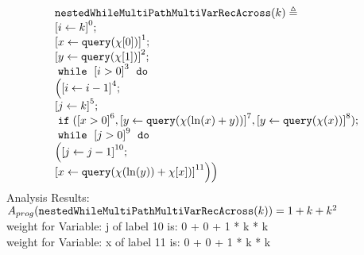                             \begin{example}
                                \[
                                \begin{array}{l}
                                \kw{nestedWhileMultiPathMultiVarRecAcross}(k) \triangleq \\
                                    \clabel{\assign{i}{k} }^{0} ; \\
                                    \clabel{ \assign{x}{\query(\chi[0])}}^{1} ; \\
                                    \clabel{ \assign{y}{\query(\chi[1])}}^{2} ; \\
                                        \ewhile ~ \clabel{i > 0}^{3} ~ \edo ~ \\
                                        \Big(
                                         \clabel{\assign{i}{i-1}}^{4} ;\\
                                         \clabel{\assign{j}{k}}^{5} ;\\
                                         \eif(\clabel{x > 0}^6, \clabel{\assign{y}{\query(\chi(\ln(x) + y))} }^{7},
                                         \clabel{\assign{y}{\query(\chi(x))} }^{8} )
                                          ; \\
                                         \ewhile ~ \clabel{j > 0}^{9} ~ \edo ~ \\
                                         \Big(
                                          \clabel{\assign{j}{j-1}}^{10};\\
                                          \clabel{\assign{x}{\query(\chi(\ln(y))+\chi[x])} }^{11}
                                          \Big) \Big)
                                    \end{array}
                                \]
                                Analysis Results: $ A_{{prog}}(\mathtt{nestedWhileMultiPathMultiVarRecAcross}(k)) = 1 + k + k^2$
                                \\
                                weight for Variable: j of label 10 is: 0 + 0 + 1 * k * k \\
                                weight for Variable: x of label 11 is: 0 + 0 + 1 * k * k \\

\end{example}
